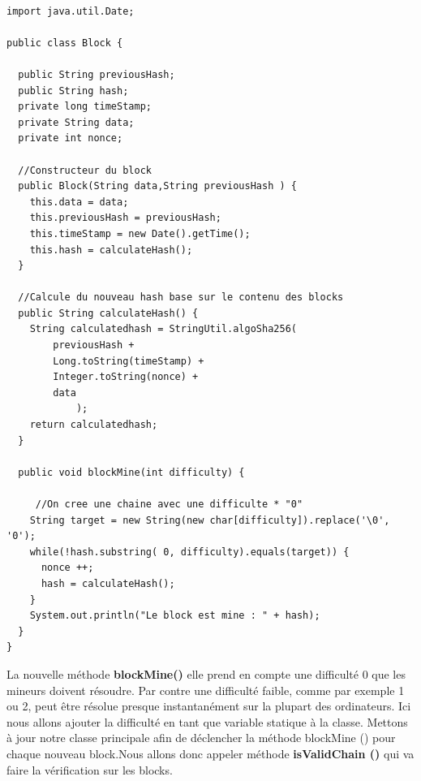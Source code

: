 \documentclass[12pt]{report}
\begin{document}
\begin{lstlisting}

import java.util.Date;

public class Block {

  public String previousHash;
  public String hash;
  private long timeStamp;
  private String data;  
  private int nonce;
	
  //Constructeur du block
  public Block(String data,String previousHash ) {
    this.data = data;
    this.previousHash = previousHash;
    this.timeStamp = new Date().getTime();
    this.hash = calculateHash();
  }
	
  //Calcule du nouveau hash base sur le contenu des blocks
  public String calculateHash() {
    String calculatedhash = StringUtil.algoSha256( 
        previousHash +
        Long.toString(timeStamp) +
        Integer.toString(nonce) + 
        data 
            );
    return calculatedhash;
  }

  public void blockMine(int difficulty) {
  
     //On cree une chaine avec une difficulte * "0"
    String target = new String(new char[difficulty]).replace('\0', '0'); 
    while(!hash.substring( 0, difficulty).equals(target)) {
      nonce ++;
      hash = calculateHash();
    }
    System.out.println("Le block est mine : " + hash);
  }
}
\end{lstlisting}

\hspace{1cm} La nouvelle méthode \textbf{blockMine()} elle prend en compte une difficulté 0 que les mineurs doivent résoudre. Par contre une difficulté faible, comme par exemple  1 ou 2, peut être résolue presque instantanément sur la plupart des ordinateurs. 
Ici nous allons ajouter la difficulté en tant que variable statique à la classe. Mettons à jour notre classe principale afin de déclencher la méthode blockMine () pour chaque nouveau block.Nous allons donc appeler méthode \textbf{isValidChain ()} qui va faire la vérification sur les blocks.
\end{document}
